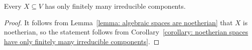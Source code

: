 \begin{corollary}
  Every $X \subseteq V$ has only finitely many irreducible components.
\end{corollary}


\begin{proof}
  It follows from Lemma~\ref{lemma: algebraic spaces are noetherian} that $X$ is noetherian, so the statement follows from Corollary~\ref{corollary: noetherian spaces have only finitely many irreducible components}.
\end{proof}








